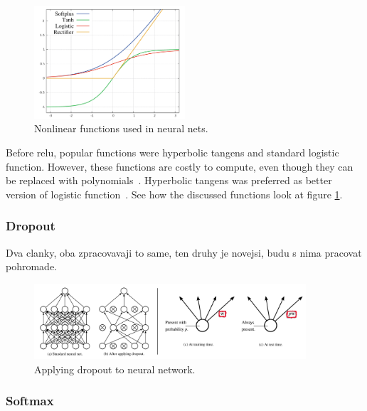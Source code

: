 \begin{figure}[!t]
	\centering
	\includegraphics[width=0.5\textwidth]{fig/nonlinearities.pdf}
	\caption{Nonlinear functions used in neural nets.
		\label{fig:nonlinear}}
\end{figure}
Before \gls{relu}, popular functions were hyperbolic tangens and standard logistic function. However, these functions are costly to compute, even though they can be replaced with polynomials~\cite{lecun2012efficient}. Hyperbolic tangens was preferred as better version of logistic function~\cite{lecun2012efficient}. See how the discussed functions look at figure \ref{fig:nonlinear}.

\subsubsection{Dropout}


Dva clanky, oba zpracovavaji to same, ten druhy je novejsi, budu s nima pracovat pohromade.~\cite{DBLP:journals/corr/abs-1207-0580, JMLR:v15:srivastava14a}

\begin{figure}[!t]
	\centering
	\includegraphics[width=0.9\textwidth]{fig/dropout.pdf}
	\caption{Applying dropout to neural network. \cite{JMLR:v15:srivastava14a}
		\label{fig:dropout}}
\end{figure}

\subsubsection{Softmax}


